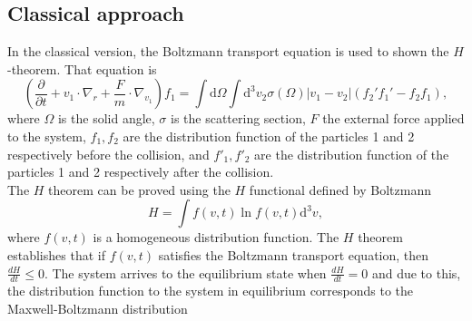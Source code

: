 \documentclass{article}
\begin{document}
\subsection{Classical approach}
In the classical version, the Boltzmann transport equation is used to shown the $H$-theorem. That equation is
\begin{equation}
    \left( \frac{\partial }{\partial t}+v_1 \cdot \nabla_r +\frac{F}{m} \cdot \nabla_{v_1} \right)f_1=\int \mathrm{d}\Omega \int \mathrm{d}^{3}v_2\sigma(\Omega)|v_1-v_2|(f_2'f_1'-f_2f_1),
\end{equation}
where $\Omega$ is the solid angle, $\sigma$ is the scattering section, $F$ the external force applied to the system, $f_1, f_2$ are the distribution function of the particles 1 and 2 respectively before the collision, and $f'_1, f'_2$ are the distribution function of the particles 1 and 2 respectively after the collision.\\
The $H$ theorem can be proved using the $H$ functional defined by Boltzmann 
\begin{equation}
    H=\int f(v,t) \ln f(v,t) \mathrm{d}^{3}v,
\end{equation} \label{hfunctional}
where $f(v,t)$ is a homogeneous distribution function. The $H$ theorem establishes that if $f(v,t)$ satisfies the Boltzmann transport equation, then $\frac{dH}{dt}\leq 0$. The system arrives to the equilibrium state when $\frac{dH}{dt}=0$ and due to this, the distribution function to the system in equilibrium corresponds to the Maxwell-Boltzmann distribution
\end{document}
